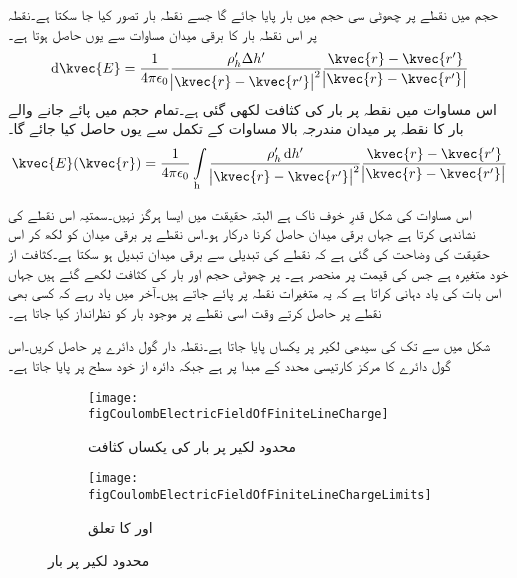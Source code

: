 حجم میں   نقطے پر چھوٹی سی حجم  میں  بار پایا جائے گا جسے نقطہ بار تصور کیا جا سکتا ہے۔نقطہ  پر اس نقطہ بار کا برقی میدان  مساوات  سے یوں حاصل ہوتا ہے۔
\begin{align*}
\dif \kvec{E}=\frac{1}{4 \pi \epsilon_0 }\frac{\rho_h' \Delta h'}{\abs{\kvec{r}-\kvec{r'}}^2} \frac{\kvec{r}-\kvec{r'}}{\abs{\kvec{r}-\kvec{r'}}}
\end{align*}
اس مساوات میں  نقطہ  پر بار کی کثافت  لکھی گئی ہے۔تمام حجم میں پائے جانے والے بار کا نقطہ  پر میدان مندرجہ بالا مساوات کے تکمل سے یوں حاصل کیا جائے گا۔
\begin{align}\label{مساوات_کولمب_حجم_بار_کا_میدان}
\kvec{E}(\kvec{r})=\frac{1}{4 \pi \epsilon_0 }\int\limits_{\text{h}}\frac{\rho_h'  \dif h'}{\abs{\kvec{r}-\kvec{r'}}^2} \frac{\kvec{r}-\kvec{r'}}{\abs{\kvec{r}-\kvec{r'}}}
\end{align}

اس مساوات کی  شکل قدرِ خوف ناک  ہے البتہ حقیقت میں ایسا ہرگز نہیں۔سمتیہ  اس نقطے کی نشاندہی کرتا ہے جہاں برقی میدان حاصل کرنا درکار ہو۔اس نقطے پر برقی میدان
 کو   لکھ کر اس حقیقت کی وضاحت کی گئی ہے کہ نقطے کی تبدیلی سے برقی میدان تبدیل ہو سکتا ہے۔کثافت از خود  متغیرہ ہے جس کی قیمت  پر منحصر ہے۔  پر چھوٹی حجم  اور بار کی کثافت  لکھے گئے ہیں جہاں  اس بات کی یاد دہانی کراتا ہے کہ یہ متغیرات نقطہ  پر پائے جاتے ہیں۔آخر میں یاد رہے کہ کسی بھی نقطے پر  حاصل کرتے وقت اسی نقطے پر موجود بار کو نظرانداز کیا جاتا ہے۔

شکل  میں  سے  تک کی سیدھی لکیر پر  یکساں  پایا جاتا ہے۔نقطہ دار گول دائرے پر  حاصل کریں۔اس گول دائرے کا مرکز  کارتیسی محدد کے مبدا  پر ہے جبکہ دائرہ از خود  سطح پر پایا جاتا ہے۔ 
\begin{figure}
\centering
\begin{subfigure}{0.5\textwidth}
\centering
\texttt{[image: figCoulombElectricFieldOfFiniteLineCharge]}
\caption{محدود لکیر پر بار کی یکساں کثافت}
\end{subfigure}%
%
\begin{subfigure}{0.5\textwidth}
\centering
\texttt{[image: figCoulombElectricFieldOfFiniteLineChargeLimits]}
\caption{ اور  کا تعلق}
\end{subfigure}
\caption{محدود لکیر پر بار}
\label{شکل_کولمب_محدود_لکیر_پر_بار}
\end{figure}

